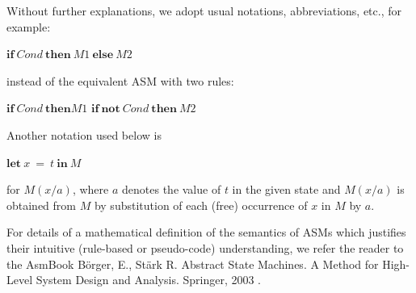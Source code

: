 Without further explanations, we adopt usual notations, abbreviations, etc., for example:

\medskip
$ \mathbf{if} ~ Cond  ~ \mathbf{then} ~ M1 ~ \mathbf{else} ~ M2$
\medskip

instead of the equivalent ASM with two rules:

\medskip
$ \mathbf{if} ~ Cond  ~ \mathbf{then}  M1$
$ \mathbf{if ~ not} ~ Cond  ~ \mathbf{then} ~ M2$
\medskip

Another notation used below is

\medskip
$ \mathbf{let} ~ x ~ = ~ t ~ \mathbf{in} ~ M$
\medskip

for $M(x/a)$, where $a$ denotes the value of $t$ in the given state and $M(x/a)$ is obtained from $M$ by substitution of each (free) occurrence of $x$ in $M$ by $a$.

For details of a mathematical definition of the semantics of ASMs which justifies their intuitive (rule-based or pseudo-code) understanding, we refer the reader to the AsmBook Börger, E., Stärk R. Abstract State Machines. A Method for High-Level System Design and Analysis. Springer, 2003 \cite{book:ASM-2003}.





